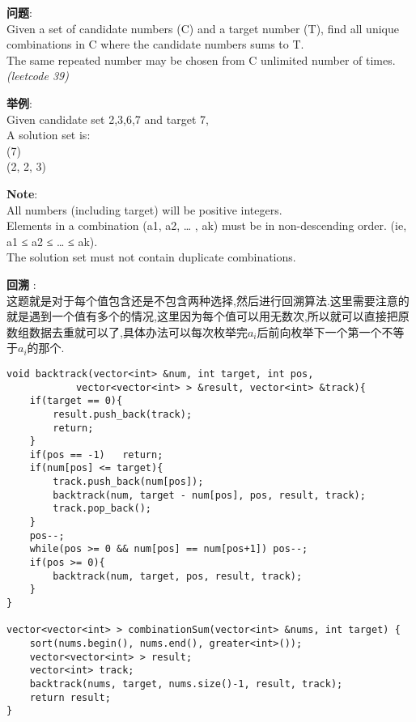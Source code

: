     
\begin{description}
    \item{\textbf{问题}}:\\
Given a set of candidate numbers (C) and a target number (T), find all unique combinations in C where the candidate numbers sums to T.\\
The same repeated number may be chosen from C unlimited number of times.\\
\textit{(leetcode 39)}
    \item{\textbf{举例}}:\\
Given candidate set 2,3,6,7 and target 7, \\
A solution set is: \\
(7) \\
(2, 2, 3) 
	\item{\textbf{Note}}:\\
All numbers (including target) will be positive integers.\\
Elements in a combination (a1, a2, … , ak) must be in non-descending order. (ie, a1 ≤ a2 ≤ … ≤ ak).\\
The solution set must not contain duplicate combinations.
    \item{\textbf{回溯}} : 
    \\这题就是对于每个值包含还是不包含两种选择,然后进行回溯算法.这里需要注意的就是遇到一个值有多个的情况,这里因为每个值可以用无数次,所以就可以直接把原数组数据去重就可以了,具体办法可以每次枚举完$a_i$后前向枚举下一个第一个不等于$a_i$的那个.
    \begin{lstlisting}
void backtrack(vector<int> &num, int target, int pos, 
			vector<vector<int> > &result, vector<int> &track){
	if(target == 0){
		result.push_back(track);
		return;
	}
	if(pos == -1)	return;
	if(num[pos] <= target){
		track.push_back(num[pos]);
		backtrack(num, target - num[pos], pos, result, track);
		track.pop_back();
	}
	pos--;
	while(pos >= 0 && num[pos] == num[pos+1]) pos--;
	if(pos >= 0){
		backtrack(num, target, pos, result, track);
	}
}

vector<vector<int> > combinationSum(vector<int> &nums, int target) {
	sort(nums.begin(), nums.end(), greater<int>());
	vector<vector<int> > result;
	vector<int> track;
	backtrack(nums, target, nums.size()-1, result, track);
	return result;
}
    \end{lstlisting}
\end{description}
